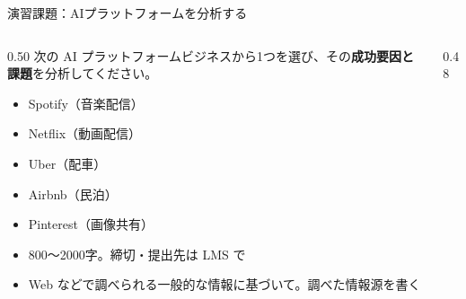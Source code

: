 \documentclass[aspectratio=169]{beamer}
\begin{document}
\begin{frame}{演習課題：AIプラットフォームを分析する}
\begin{columns}[T]
\begin{column}{0.50\textwidth}
\small
次の AI プラットフォームビジネスから1つを選び、その\textbf{成功要因と課題}を分析してください。
\begin{itemize}
  \item Spotify（音楽配信）
  \item Netflix（動画配信）
  \item Uber（配車）
  \item Airbnb（民泊）
  \item Pinterest（画像共有）
\end{itemize}
\medskip
\begin{itemize}\footnotesize
  \item 800〜2000字。締切・提出先は LMS で
  \item Web などで調べられる一般的な情報に基づいて。調べた情報源を書く
\end{itemize}
\end{column}
\begin{column}{0.48\textwidth}
\end{column}
\end{columns}
\end{frame}

\end{document}
